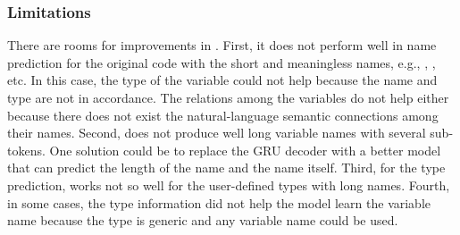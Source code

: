 \subsubsection{Limitations}
\label{sec:limitations}

There are rooms for improvements in {\tool}. First, it does not
perform well in name prediction for the original code with the short
and meaningless names, e.g., , , etc. In this case,
the type of the variable could not help because the name and type are
not in accordance. The relations among the variables do not help
either because there does not exist the natural-language semantic
connections among their names. Second, {\tool} does not produce well
long variable names with several sub-tokens. One solution could be to
replace the GRU decoder with a better model that can predict the
length of the name and the name itself. Third, for the type
prediction, {\tool} works not so well for the user-defined types with
long names. Fourth, in some cases, the type information did not help
the model learn the variable name because the type is generic and any
variable name could be used.
